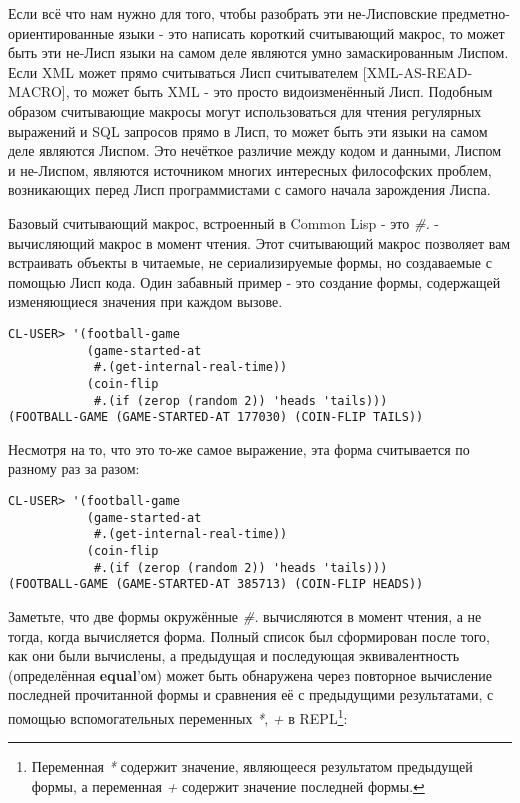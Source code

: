 Если всё что нам нужно для того, чтобы разобрать эти не-Лисповские предметно-ориентированные языки - это написать короткий считывающий макрос, то может быть эти не-Лисп языки на самом деле являются умно замаскированным Лиспом. Если XML может прямо считываться Лисп считывателем [XML-AS-READ-MACRO], то может быть XML - это просто видоизменённый Лисп. Подобным образом считывающие макросы могут использоваться для чтения регулярных выражений и SQL запросов прямо в Лисп, то может быть эти языки на самом деле являются Лиспом. Это нечёткое различие между кодом и данными, Лиспом и не-Лиспом, являются источником многих интересных философских проблем, возникающих перед Лисп программистами с самого начала зарождения Лиспа.

Базовый считывающий макрос, встроенный в Common Lisp - это \emph{\#.} - вычисляющий макрос в момент чтения. Этот считывающий макрос позволяет вам встраивать объекты в читаемые, не сериализируемые формы, но создаваемые с помощью Лисп кода. Один забавный пример - это создание формы, содержащей изменяющиеся значения при каждом вызове.

\begin{verbatim}
CL-USER> '(football-game
           (game-started-at
            #.(get-internal-real-time))
           (coin-flip
            #.(if (zerop (random 2)) 'heads 'tails)))
(FOOTBALL-GAME (GAME-STARTED-AT 177030) (COIN-FLIP TAILS))
\end{verbatim}

Несмотря на то, что это то-же самое выражение, эта форма считывается по разному раз за разом:

\begin{verbatim}
CL-USER> '(football-game
           (game-started-at
            #.(get-internal-real-time))
           (coin-flip
            #.(if (zerop (random 2)) 'heads 'tails)))
(FOOTBALL-GAME (GAME-STARTED-AT 385713) (COIN-FLIP HEADS))
\end{verbatim}

Заметьте, что две формы окружённые \emph{\#.} вычисляются в момент чтения, а не тогда, когда вычисляется форма. Полный список был сформирован после того, как они были вычислены, а предыдущая и последующая эквивалентность (определённая \textbf{equal}'ом) может быть обнаружена через повторное вычисление последней прочитанной формы и сравнения её с предыдущими результатами, с помощью вспомогательных переменных \emph{*}, \emph{+} в REPL\footnote{Переменная \emph{*} содержит значение, являющееся результатом предыдущей формы, а переменная \emph{+} содержит значение последней формы.}:

